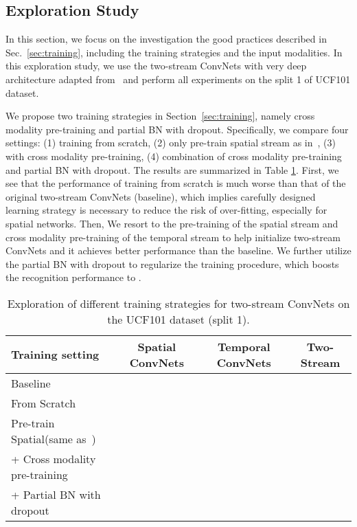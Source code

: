\documentclass[runningheads]{llncs}
\begin{document}
\subsection{Exploration Study}

In this section, we focus on the investigation the good practices described in Sec.~\ref{sec:training}, including the training strategies and the input modalities. In this exploration study, we use the two-stream ConvNets with very deep architecture adapted from~\cite{IoffeS15} and perform all experiments on the split 1 of UCF101 dataset.

We propose two training strategies in Section~\ref{sec:training}, namely cross modality pre-training and partial BN with dropout. Specifically, we compare four settings: (1) training from scratch, (2) only pre-train spatial stream as in~\cite{SimonyanZ14}, (3) with cross modality pre-training, (4) combination of cross modality pre-training and partial BN with dropout. The results are summarized in Table \ref{tbl:learning}. First, we see that the performance of training from scratch is much worse than that of the original two-stream ConvNets (baseline), which implies carefully designed learning strategy is necessary to reduce the risk of over-fitting, especially for spatial networks. Then, We resort to the pre-training of the spatial stream and cross modality pre-training of the temporal stream to help initialize two-stream ConvNets and it achieves better performance than the baseline. We further utilize the partial BN with dropout to regularize the training procedure, which boosts the recognition performance to .

\begin{table}[t]
	\begin{center}
		\caption{Exploration of different training strategies for two-stream ConvNets on the UCF101 dataset (split 1).}
		\label{tbl:learning}
		\begin{tabular}{|l|c|c|c|}
			\hline
			Training setting & Spatial ConvNets  & Temporal ConvNets & Two-Stream \\
			\hline 
			Baseline \cite{SimonyanZ14} &  &  & \\
			\hline
			From Scratch  &   &   &  \\
			\hline
			Pre-train Spatial(same as~\cite{SimonyanZ14})  &  &   &  \\
			\hline
			+ Cross modality pre-training  &  &   &  \\
			\hline
			+ Partial BN with dropout &  &  &  \\
			\hline
		\end{tabular}
	\end{center}
\end{table}
\end{document}
